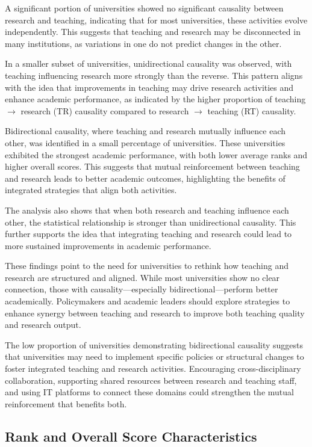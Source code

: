 \documentclass[a4paper, conference]{IEEEtran}
\begin{document}
A significant portion of universities showed no significant causality between research and teaching, indicating that for most universities, these activities evolve independently. This suggests that teaching and research may be disconnected in many institutions, as variations in one do not predict changes in the other.

In a smaller subset of universities, unidirectional causality was observed, with teaching influencing research more strongly than the reverse. This pattern aligns with the idea that improvements in teaching may drive research activities and enhance academic performance, as indicated by the higher proportion of teaching $\rightarrow$ research (TR) causality compared to research $\rightarrow$ teaching (RT) causality.

Bidirectional causality, where teaching and research mutually influence each other, was identified in a small percentage of universities. These universities exhibited the strongest academic performance, with both lower average ranks and higher overall scores. This suggests that mutual reinforcement between teaching and research leads to better academic outcomes, highlighting the benefits of integrated strategies that align both activities.

The analysis also shows that when both research and teaching influence each other, the statistical relationship is stronger than unidirectional causality. This further supports the idea that integrating teaching and research could lead to more sustained improvements in academic performance.

These findings point to the need for universities to rethink how teaching and research are structured and aligned. While most universities show no clear connection, those with causality—especially bidirectional—perform better academically. Policymakers and academic leaders should explore strategies to enhance synergy between teaching and research to improve both teaching quality and research output.

The low proportion of universities demonstrating bidirectional causality suggests that universities may need to implement specific policies or structural changes to foster integrated teaching and research activities. Encouraging cross-disciplinary collaboration, supporting shared resources between research and teaching staff, and using IT platforms to connect these domains could strengthen the mutual reinforcement that benefits both.


\subsection{Rank and Overall Score Characteristics}
\end{document}
